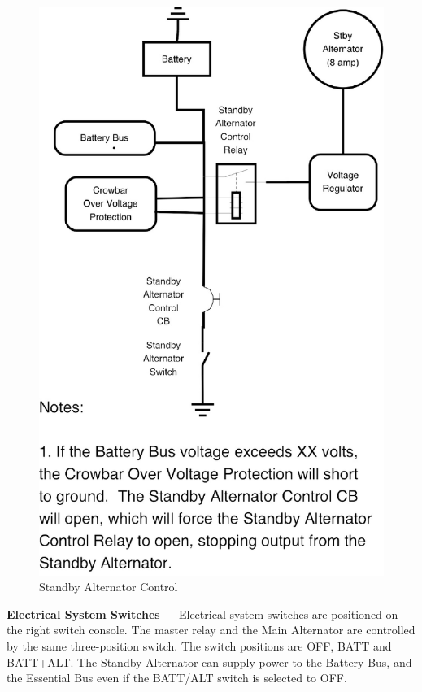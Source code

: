 \begin{figure}
\centering
\includegraphics[scale=0.4]{../Diagrams/Alternator2_large_note_narrow_gc} \caption{Standby Alternator Control}
\end{figure}

\textbf{Electrical System Switches} --- Electrical system switches are positioned on the right switch console. The master relay and the Main Alternator are controlled by the same three-position switch. The switch positions are OFF, BATT and BATT+ALT. The Standby Alternator can supply power to the Battery Bus, and the Essential Bus even if the BATT/ALT switch is selected to OFF.

